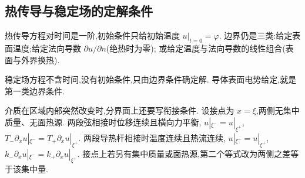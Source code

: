 \subsection{热传导与稳定场的定解条件}

热传导方程对时间是一阶,初始条件只给初始温度 $u|_{t=0}=\varphi$.
边界仍是三类:给定表面温度;给定法向导数 $\partial u/\partial n$(绝热时为零);
或给定温度与法向导数的线性组合(表面与外界换热).

稳定场方程不含时间,没有初始条件,只由边界条件确定解.
导体表面电势给定,就是第一类边界条件.

介质在区域内部突然改变时,分界面上还要写衔接条件.
设接点为 $x=\xi$,两侧无集中质量、无面热源.
两段弦相接时位移连续且横向力平衡,
$u|_{\xi^-}=u|_{\xi^+}$,
$T_-\partial_x u|_{\xi^-}=T_+\partial_x u|_{\xi^+}$.
两段导热杆相接时温度连续且热流连续,
$u|_{\xi^-}=u|_{\xi^+}$,
$k_-\partial_x u|_{\xi^-}=k_+\partial_x u|_{\xi^+}$.
接点上若另有集中质量或面热源,第二个等式改为两侧之差等于该集中量.

